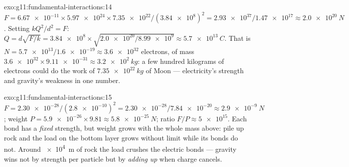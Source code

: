 \begin{solution}{exo:g11:fundamental-interactions:14}
$F = \num{6.67e-11} \times \num{5.97e24} \times \num{7.35e22} /
(\num{3.84e8})^2 = \num{2.93e37}/\num{1.47e17} \approx \qty{2.0e20}{N}$.
Setting $kQ^2/d^2 = F$:
$Q = d\sqrt{F/k} = \num{3.84e8} \times \sqrt{\num{2.0e20}/\num{8.99e9}}
\approx \qty{5.7e13}{C}$. That is
$N = \num{5.7e13}/\num{1.6e-19} \approx \num{3.6e32}$ electrons, of
mass $\num{3.6e32} \times \num{9.11e-31} \approx \qty{3.2e2}{kg}$: a
few hundred kilograms of electrons could do the work of
$\qty{7.35e22}{kg}$ of Moon --- electricity's strength and gravity's
weakness in one number.
\end{solution}

\begin{solution}{exo:g11:fundamental-interactions:15}
$F = \num{2.30e-28}/(\num{2.8e-10})^2 = \num{2.30e-28}/\num{7.84e-20}
\approx \qty{2.9e-9}{N}$; weight
$P = \num{5.9e-26} \times 9.81 \approx \qty{5.8e-25}{N}$; ratio
$F/P \approx \num{5e15}$. Each bond has a \emph{fixed} strength, but
weight grows with the whole mass above: pile up rock and the load on
the bottom layer grows without limit while its bonds do not. Around
\qty{e4}{m} of rock the load crushes the electric bonds --- gravity
wins not by strength per particle but by \emph{adding up} when charge
cancels.
\end{solution}

